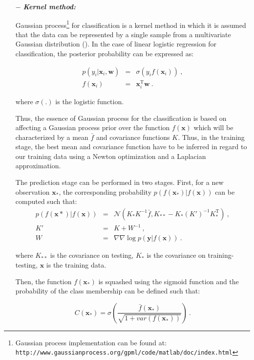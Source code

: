\begin{enumerate}[leftmargin=*]
\item[$-$] \textbf{\textit{Kernel method:}}

Gaussian process\footnote{Gaussian process implementation can be found at: \texttt{http://www.gaussianprocess.org/gpml/\allowbreak code/matlab/doc/index.html}} for classification is a kernel method in which it is assumed that the data can be represented by a single sample from a multivariate Gaussian distribution (\cite{Rasmussen2005}). In the case of linear logistic regression for classification, the posterior probability can be expressed as:

\begin{eqnarray}
	p(y_i|\mathbf{x}_i,\mathbf{w}) & = & \sigma(y_i f(\mathbf{x}_i)) \ , \label{eq:gp1} \\
	f(\mathbf{x}_i) & = & \mathbf{x}_i^{\text{T}} \mathbf{w} \ . \nonumber
\end{eqnarray}

\noindent where $\sigma(.)$ is the logistic function.

Thus, the essence of Gaussian process for the classification is based on affecting a Gaussian process prior over the function $f(\mathbf{x})$ which will be characterized by a mean $\bar{f}$ and covariance functions $K$. Thus, in the training stage, the best mean and covariance function have to be inferred in regard to our training data using a Newton optimization and a Laplacian approximation.

The prediction stage can be performed in two stages. First, for a new observation $\mathbf{x}_*$, the corresponding probability $p(f(\mathbf{x}_*)|f(\mathbf{x}))$ can be computed such that:
\begin{eqnarray}
	p(f(\mathbf{x}*)|f(\mathbf{x})) & = & \mathcal{N}( K_*K^{-1}\bar{f}, K_{**}-K_*(K')^{-1}K_*^{\text{T}} ) \ , \nonumber \\
	K' & = & K + W^{-1} \ , \label{eq:gp2} \\
	W & = & \nabla \nabla \log p(\mathbf{y}|f(\mathbf{x})) \ . \nonumber
\end{eqnarray}

\noindent where $K_{**}$ is the covariance on testing, $K_{*}$ is the covariance on training-testing, $\mathbf{x}$ is the training data.

Then, the function $f(\mathbf{x}_*)$ is squashed using the sigmoid function and the probability of the class membership can be defined such that:

\begin{equation}
	C(\mathbf{x}_*) = \sigma\left( \frac{\bar{f}(\mathbf{x_*})}{\sqrt{1+var(f(\mathbf{x}_*))}} \right) \ .
	\label{eq:gp3}
\end{equation}


\end{enumerate}
